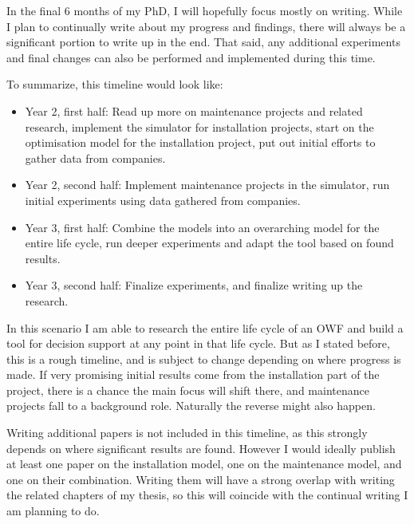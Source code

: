 \documentclass[a4paper,12pt]{article}
\begin{document}
In the final 6 months of my PhD, I will hopefully focus mostly on writing. While I plan to continually write about my progress and findings, there will always be a significant portion to write up in the end. That said, any additional experiments and final changes can also be performed and implemented during this time. 

\bigskip

To summarize, this timeline would look like:

\begin{itemize}
	\item Year 2, first half: Read up more on maintenance projects and related research, implement the simulator for installation projects, start on the optimisation model for the installation project, put out initial efforts to gather data from companies. 
	\item Year 2, second half:  Implement maintenance projects in the simulator, run initial experiments using data gathered from companies.
	\item Year 3, first half: Combine the models into an overarching model for the entire life cycle, run deeper experiments and adapt the tool based on found results.
	\item Year 3, second half: Finalize experiments, and finalize writing up the research.
\end{itemize}

In this scenario I am able to research the entire life cycle of an OWF and build a tool for decision support at any point in that life cycle. But as I stated before, this is a rough timeline, and is subject to change depending on where progress is made. If very promising initial results come from the installation part of the project, there is a chance the main focus will shift there, and maintenance projects fall to a background role. Naturally the reverse might also happen. 

Writing additional papers is not included in this timeline, as this strongly depends on where significant results are found. However I would ideally publish at least one paper on the installation model, one on the maintenance model, and one on their combination. Writing them will have a strong overlap with writing the related chapters of my thesis, so this will coincide with the continual writing I am planning to do. 

\pagebreak




\end{document}
